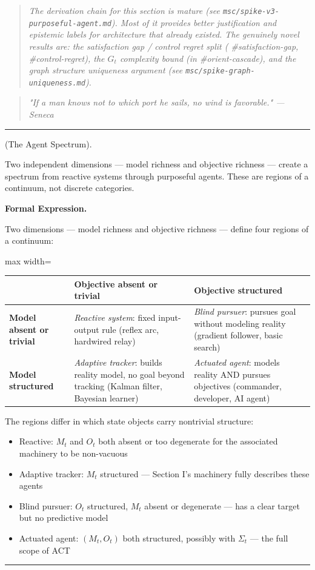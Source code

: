 \documentclass[11pt,oneside]{article}
\newcounter{claim}[section]
\renewcommand{\theclaim}{\thesection.\arabic{claim}}
\newenvironment{segment}[2]{%
  \refstepcounter{claim}%
  \bigskip\noindent\hrule\smallskip
  \noindent{\bfseries #1~\theclaim}\enskip(#2).\par\smallskip
  \noindent\ignorespaces
}{%
  \par\smallskip\noindent\hrule\bigskip
}
\newenvironment{definition}[1][]{\begin{segment}{Definition}{#1}}{\end{segment}}
\begin{document}
\begin{quote}\itshape
The derivation chain for this section is mature (see \texttt{msc/spike-v3-purposeful-agent.md}). Most of it provides better justification and epistemic labels for architecture that already existed. The genuinely novel results are: the satisfaction gap / control regret split ( \#satisfaction-gap, \#control-regret), the $G_t$ complexity bound (in \#orient-cascade), and the graph structure uniqueness argument (see \texttt{msc/spike-graph-uniqueness.md}).
\end{quote}

\begin{quote}\itshape
"If a man knows not to which port he sails, no wind is favorable." — Seneca
\end{quote}

\begin{definition}[The Agent Spectrum]
\label{agent-spectrum}
Two independent dimensions — model richness and objective richness — create a spectrum from reactive systems through purposeful agents. These are regions of a continuum, not discrete categories.



\medskip\noindent\textbf{Formal Expression.}



Two dimensions — model richness and objective richness — define four regions of a continuum:

\begin{adjustbox}{max width=\textwidth}
\small
\begin{tabular}{lll}
\toprule
 & Objective absent or trivial & Objective structured \\
\midrule
\textbf{Model absent or trivial} & \textit{Reactive system}: fixed input-output rule (reflex arc, hardwired relay) & \textit{Blind pursuer}: pursues goal without modeling reality (gradient follower, basic search) \\
\textbf{Model structured} & \textit{Adaptive tracker}: builds reality model, no goal beyond tracking (Kalman filter, Bayesian learner) & \textit{Actuated agent}: models reality AND pursues objectives (commander, developer, AI agent) \\
\bottomrule
\end{tabular}
\end{adjustbox}


The regions differ in which state objects carry nontrivial structure:
\begin{itemize}
  \item Reactive: $M_t$ and $O_t$ both absent or too degenerate for the associated machinery to be non-vacuous
  \item Adaptive tracker: $M_t$ structured — Section I's machinery fully describes these agents
  \item Blind pursuer: $O_t$ structured, $M_t$ absent or degenerate — has a clear target but no predictive model
  \item Actuated agent: $(M_t, O_t)$ both structured, possibly with $\Sigma_t$ — the full scope of ACT
\end{itemize}




\end{definition}
\end{document}
